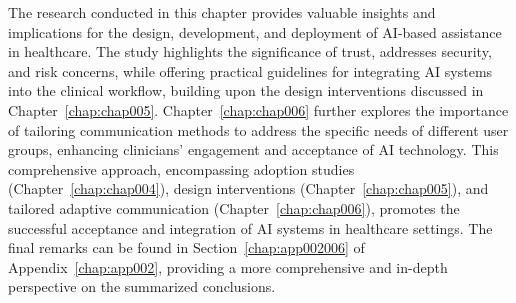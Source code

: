 The research conducted in this chapter provides valuable insights and implications for the design, development, and deployment of \ac{AI}-based assistance in healthcare.
The study highlights the significance of trust, addresses security, and risk concerns, while offering practical guidelines for integrating \ac{AI} systems into the clinical workflow, building upon the design interventions discussed in Chapter~\ref{chap:chap005}.
Chapter~\ref{chap:chap006} further explores the importance of tailoring communication methods to address the specific needs of different user groups, enhancing clinicians' engagement and acceptance of \ac{AI} technology.
This comprehensive approach, encompassing adoption studies (Chapter~\ref{chap:chap004}), design interventions (Chapter~\ref{chap:chap005}), and tailored adaptive communication (Chapter~\ref{chap:chap006}), promotes the successful acceptance and integration of \ac{AI} systems in healthcare settings.
The final remarks can be found in Section~\ref{chap:app002006} of Appendix~\ref{chap:app002}, providing a more comprehensive and in-depth perspective on the summarized conclusions.